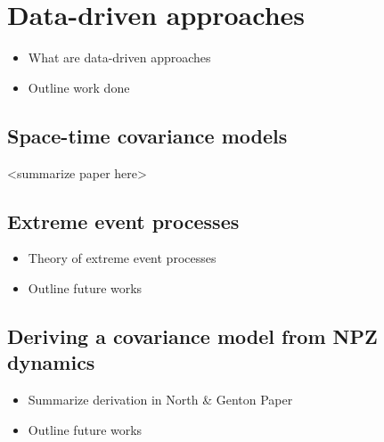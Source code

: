 

\chapter{Data-driven approaches}
\label{datadriv}

	\begin{itemize}
		\item What are data-driven approaches
		\item Outline work done
	\end{itemize}

	\section{Space-time covariance models}
	\label{datadriv:covmod}

		<summarize paper here>

	\section{Extreme event processes}

		\begin{itemize}
			\item Theory of extreme event processes
			\item Outline future works
		\end{itemize}

	\section{Deriving a covariance model from NPZ dynamics}

		\begin{itemize}
			\item Summarize derivation in North \& Genton Paper
			\item Outline future works
		\end{itemize}
